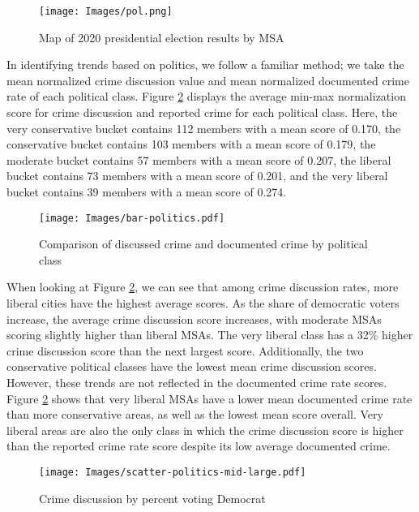 \documentclass[12pt,oneside, letterpaper]{book}
\begin{document}
\begin{figure}[ht]
    \texttt{[image: Images/pol.png]}
    \caption{Map of 2020 presidential election results by MSA}
    \label{fig:map-2}
\end{figure}

\par In identifying trends based on politics, we follow a familiar method; we take the mean normalized crime discussion value and mean normalized documented crime rate of each political class. Figure \ref{fig:graph-2} displays the average min-max normalization score for crime discussion and reported crime for each political class. Here, the very conservative bucket contains 112 members with a mean score of 0.170, the conservative bucket contains 103 members with a mean score of 0.179, the moderate bucket contains 57 members with a mean score of 0.207, the liberal bucket contains 73 members with a mean score of 0.201, and the very liberal bucket contains 39 members with a mean score of 0.274.

\begin{figure}[ht]
    \centering
    \texttt{[image: Images/bar-politics.pdf]}
    \caption{Comparison of discussed crime and documented crime by political class}
    \label{fig:graph-2}
\end{figure}

\par When looking at Figure \ref{fig:graph-2}, we can see that among crime discussion rates, more liberal cities have the highest average scores. As the share of democratic voters increase, the average crime discussion score increases, with moderate MSAs scoring slightly higher than liberal MSAs. The very liberal class has a 32\% higher crime discussion score than the next largest score. Additionally, the two conservative political classes have the lowest mean crime discussion scores. However, these trends are not reflected in the documented crime rate scores. Figure \ref{fig:graph-2} shows that very liberal MSAs have a lower mean documented crime rate than more conservative areas, as well as the lowest mean score overall. Very liberal areas are also the only class in which the crime discussion score is higher than the reported crime rate score despite its low average documented crime.

\begin{figure}[ht]
    \centering
    \texttt{[image: Images/scatter-politics-mid-large.pdf]}
    \caption{Crime discussion by percent voting Democrat}
    \label{fig:scatter-1}
\end{figure}
\end{document}
